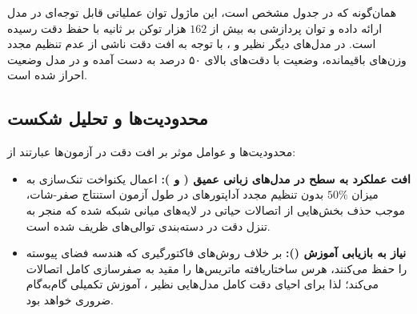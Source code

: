 همان‌گونه که در جدول مشخص است، این ماژول توان عملیاتی قابل توجه‌ای در مدل  ارائه داده و توان پردازشی به بیش از $162$ هزار توکن بر ثانیه با حفظ دقت  رسیده است. در مدل‌های دیگر نظیر  و ، با توجه به افت دقت ناشی از عدم تنظیم مجدد وزن‌های باقیمانده، وضعیت  با دقت‌های بالای ۵۰ درصد به دست آمده و در مدل  وضعیت  احراز شده است.

\subsection{محدودیت‌ها و تحلیل شکست}
محدودیت‌ها و عوامل موثر بر افت دقت در آزمون‌ها عبارتند از:
\begin{itemize}
    \item \textbf{افت عملکرد به سطح  در مدل‌های زبانی عمیق ( و ):} اعمال یکنواخت تنک‌سازی به میزان $50\%$ بدون تنظیم مجدد آداپتورهای  در طول آزمون استنتاج صفر-شات، موجب حذف بخش‌هایی از اتصالات حیاتی در لایه‌های میانی شبکه شده که منجر به تنزل دقت در دسته‌بندی توالی‌های ظریف شده است.
    \item \textbf{نیاز به بازیابی آموزش ():} بر خلاف روش‌های فاکتورگیری که هندسه فضای پیوسته را حفظ می‌کنند، هرس ساختاریافته ماتریس‌ها را مقید به صفرسازی کامل اتصالات می‌کند؛ لذا برای احیای دقت کامل مدل‌هایی نظیر ، آموزش تکمیلی گام‌به‌گام ضروری خواهد بود.
\end{itemize}
